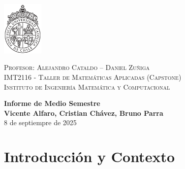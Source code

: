 \documentclass[a4paper, 11pt]{article} %
\newcommand{\departamento}{Instituto de Ingeniería Matemática y Computacional }
\newcommand{\ramo}{Taller de Matemáticas Aplicadas (Capstone) }
\newcommand{\sigla}{IMT2116 }
\newcommand{\titulo}{Informe de Medio Semestre }
\newcommand{\profe}{Alejandro Cataldo -- Daniel Zuñiga }
\newcommand{\nombre}{Vicente Alfaro, Cristian Chávez, Bruno Parra}
\begin{document}
\thispagestyle{empty} %
\begin{minipage}{2cm}
\vspace{-1.5cm}
\includegraphics[width=2cm]{images/logo.pdf}
\vspace{-1.4cm}
\end{minipage}
\begin{minipage}{\linewidth}
\raggedright \footnotesize
\textsc{Profesor: \profe\\
\sigla - \ramo \\
\departamento}
\end{minipage}
\vspace{0.5cm}


\vspace*{8cm}
\begin{center} 
	{\huge \bf \titulo}\\
	\vspace{2mm}
	{\bf \nombre}\\
        \vspace{1mm}
        {8 de septiempre de 2025}
\end{center}
\newpage

\section{Introducción y Contexto}

\end{document}
